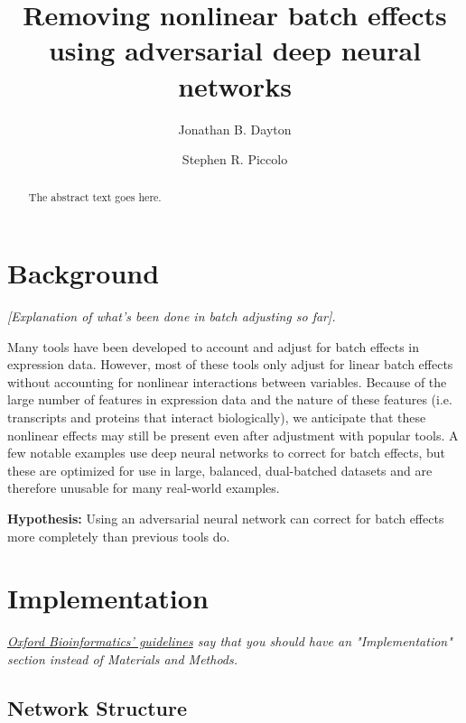 \documentclass[notitlepage]{article}
\begin{document}
\title{Removing nonlinear batch effects using adversarial deep neural networks}
\author[1]{Jonathan B. Dayton}
\author[1]{Stephen R. Piccolo}
\date{}

\maketitle

\begin{abstract}
	The abstract text goes here.
\end{abstract}

\section{Background}

\emph{[Explanation of what's been done in batch adjusting so far].}

Many tools have been developed to account and adjust for batch effects in expression data.
However, most of these tools only adjust for linear batch effects without accounting for nonlinear interactions between variables.
Because of the large number of features in expression data and the nature of these features (i.e. transcripts and proteins that interact biologically), we anticipate that these nonlinear effects may still be present even after adjustment with popular tools.
A few notable examples \cite{shaham_removal_2017,shaham_batch_2018} use deep neural networks to correct for batch effects, but these are optimized for use in large, balanced, dual-batched datasets and are therefore unusable for many real-world examples.

\textbf{Hypothesis:}
Using an adversarial neural network can correct for batch effects more completely than previous tools do. %

\section{Implementation}

\emph{\href{https://bmcbioinformatics.biomedcentral.com/submission-guidelines/preparing-your-manuscript/software-article}{Oxford Bioinformatics' guidelines} say that you should have an "Implementation" section instead of Materials and Methods.}

\subsection{Network Structure}
\end{document}
